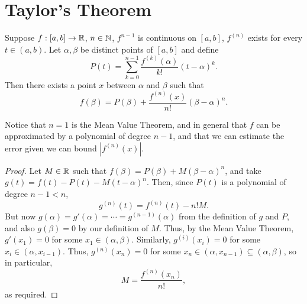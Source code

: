 \section{Taylor's Theorem}

\begin{theorem} %
    Suppose $f: [a, b] \rightarrow \mathbb{R}$, $n \in \mathbb{N}$, $f^{n-1}$ is continuous on $[a, b]$, $f^{(n)}$ exists for every $t \in (a, b)$. Let $\alpha, \beta$ be distinct points of $[a, b]$ and define
    \[
        P(t) = \sum_{k=0}^{n-1} \frac{f^{(k)}(\alpha)}{k!} (t - \alpha)^k.
    \]
    Then there exists a point $x$ between $\alpha$ and $\beta$ such that
    \[
        f(\beta) = P(\beta) + \frac{f^{(n)}(x)}{n!} (\beta - \alpha)^n.
    \]

    Notice that $n = 1$ is the Mean Value Theorem, and in general that $f$ can be approximated by a polynomial of degree $n - 1$, and that we can estimate the error given we can bound $|f^{(n)}(x)|$.

    \begin{proof}
        Let $M \in \mathbb{R}$ such that $f(\beta) = P(\beta) + M(\beta - \alpha)^n$, and take $g(t) = f(t) - P(t) - M(t - \alpha)^n$. Then, since $P(t)$ is a polynomial of degree $n - 1 < n$, 
        \[
            g^{(n)}(t) = f^{(n)}(t) - n! M.
        \]
        But now $g(\alpha) = g'(\alpha) = \dotsb = g^{(n-1)}(\alpha)$ from the definition of $g$ and $P$, and also $g(\beta) = 0$ by our definition of $M$. Thus, by the Mean Value Theorem, $g'(x_1) = 0$ for some $x_1 \in (\alpha, \beta)$. Similarly, $g^{(i)}(x_i) = 0$ for some $x_i \in (\alpha, x_{i-1})$. Thus, $g^{(n)}(x_n) = 0$ for some $x_n \in (\alpha, x_{n-1}) \subseteq (\alpha, \beta)$, so in particular,
        \[
            M = \frac{f^{(n)}(x_n)}{n!},
        \]
        as required.
    \end{proof}
\end{theorem}
